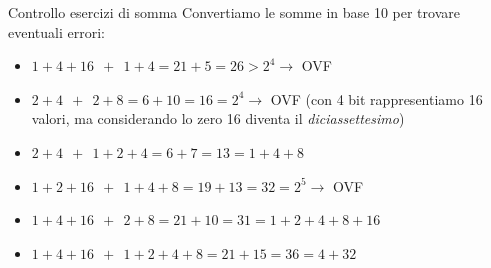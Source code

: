 \documentclass[handout]{beamer}
\begin{document}
\begin{frame}{Controllo esercizi di somma}
Convertiamo le somme in base 10 per trovare eventuali errori:

\begin{itemize}
\item $1+4+16 \ \ + \ \ 1+4 = 21+5 = 26 > 2^4 \rightarrow$ \alert{OVF}
\item $2+4 \ \ + \ \ 2+8 = 6+10 = 16 = 2^4 \rightarrow$ \alert{OVF} (con 4 bit rappresentiamo 16 valori, ma considerando lo zero 16 diventa il \emph{diciassettesimo})
\item $2+4 \ \ + \ \ 1+2+4 = 6+7 = 13 = 1+4+8$
\item $1+2+16 \ \ + \ \ 1+4+8 = 19+13 = 32 = 2^5 \rightarrow$ \alert{OVF}
\item $1+4+16 \ \ + \ \ 2+8 = 21+10 = 31 = 1+2+4+8+16$
\item $1+4+16 \ \ + \ \ 1+2+4+8 = 21+15 = 36 = 4+32$
\end{itemize}
\end{frame}
\end{document}
